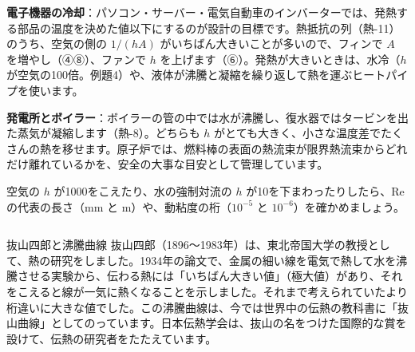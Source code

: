 \begin{phkougaku}[熱を運ぶ流れを設計する]
\textbf{電子機器の冷却}：パソコン・サーバー・電気自動車のインバーターでは、発熱する部品の温度を決めた値以下にするのが設計の目標です。熱抵抗の列（熱-11）のうち、空気の側の $1/(hA)$ がいちばん大きいことが多いので、フィンで $A$ を増やし（④⑧）、ファンで $h$ を上げます（⑥）。発熱が大きいときは、水冷（$h$ が空気の100倍。例題4）や、液体が沸騰と凝縮を繰り返して熱を運ぶヒートパイプを使います。

\textbf{発電所とボイラー}：ボイラーの管の中では水が沸騰し、復水器ではタービンを出た蒸気が凝縮します（熱-8）。どちらも $h$ がとても大きく、小さな温度差でたくさんの熱を移せます。原子炉では、燃料棒の表面の熱流束が限界熱流束からどれだけ離れているかを、安全の大事な目安として管理しています。

\begin{phketa}[対流熱伝達の数の目安]
空気の $h$ が1000をこえたり、水の強制対流の $h$ が10を下まわったりしたら、Re の代表の長さ（mm と m）や、動粘度の桁（$10^{-5}$ と $10^{-6}$）を確かめましょう。
\end{phketa}
\end{phkougaku}

\begin{column}{抜山四郎と沸騰曲線}
抜山四郎（1896〜1983年）は、東北帝国大学の教授として、熱の研究をしました。1934年の論文で、金属の細い線を電気で熱して水を沸騰させる実験から、伝わる熱には「いちばん大きい値」（極大値）があり、それをこえると線が一気に熱くなることを示しました。それまで考えられていたより桁違いに大きな値でした。この沸騰曲線は、今では世界中の伝熱の教科書に「抜山曲線」としてのっています。日本伝熱学会は、抜山の名をつけた国際的な賞を設けて、伝熱の研究者をたたえています。
\end{column}

